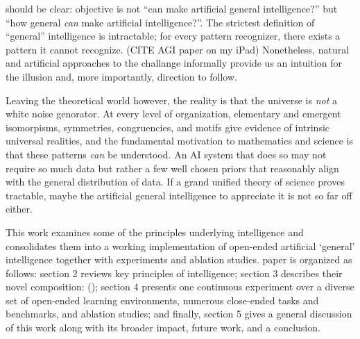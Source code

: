 \We should be clear: \our objective is not ``can \we make artificial general intelligence?'' but ``how general \textit{can} \we make artificial intelligence?''. The strictest definition of ``general'' intelligence is intractable; for every pattern recognizer, there exists a pattern it cannot recognize. (CITE AGI paper on my iPad) Nonetheless, natural and artificial approaches to the challange informally provide us an intuition for the illusion and, more importantly, direction to follow.

Leaving the theoretical world however, the reality is that the universe is \textit{not} a white noise genorator. At every level of organization, elementary and emergent isomorpisms, symmetries, congruencies, and motifs give evidence of intrinsic universal realities, and the fundamental motivation to mathematics and science is that these patterns \textit{can} be understood. An AI system that does so may not require so much data but rather a few well chosen priors that reasonably align with the general distribution of data. If a grand unified theory of science proves tractable, maybe the artificial general intelligence to appreciate it is not so far off either.

This work examines some of the principles underlying intelligence and consolidates them into a working implementation of open-ended artificial `general' intelligence together with experiments and ablation studies. \Our paper is organized as follows: section 2 reviews key principles of intelligence; section 3 describes their novel composition: \pgi (\PGI); section 4 presents one continuous experiment over a diverse set of open-ended learning environments, numerous close-ended tasks and benchmarks, and ablation studies; and finally, section 5 gives a general discussion of this work along with its broader impact, future work, and a conclusion.   
